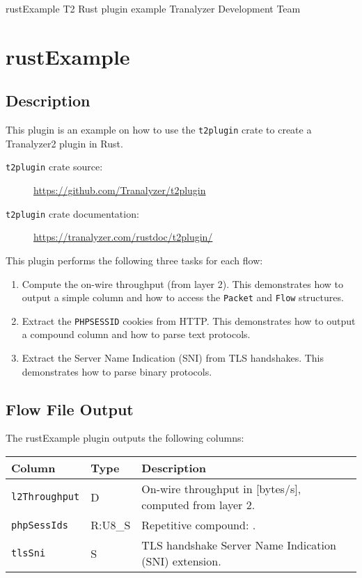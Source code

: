 \documentclass[documentation]{subfiles}
\begin{document}
\trantitle
    {rustExample} %
    {T2 Rust plugin example} %
    {Tranalyzer Development Team} %

\section{rustExample}\label{s:rustExample}

\subsection{Description}
This plugin is an example on how to use the {\tt t2plugin} crate to create a Tranalyzer2 plugin
in Rust.

\begin{description}
    \item[{\tt t2plugin} crate source:] {\url{https://github.com/Tranalyzer/t2plugin}}
    \item[{\tt t2plugin} crate documentation:] {\url{https://tranalyzer.com/rustdoc/t2plugin/}}
\end{description}

This plugin performs the following three tasks for each flow:

\begin{enumerate}
    \item Compute the on-wire throughput (from layer 2). This demonstrates how to output a simple
        column and how to access the {\tt Packet} and {\tt Flow} structures.
    \item Extract the {\tt PHPSESSID} cookies from HTTP. This demonstrates how to output a
        compound column and how to parse text protocols.
    \item Extract the Server Name Indication (SNI) from TLS handshakes. This demonstrates how to
        parse binary protocols.
\end{enumerate}

\subsection{Flow File Output}
The rustExample plugin outputs the following columns:
\begin{longtable}{llll}
    {\bf Column} & {\bf Type} & {\bf Description}\\
    \hline\endhead
    {\tt l2Throughput} & D & On-wire throughput in [bytes/s], computed from layer 2.\\
    {\tt phpSessIds} & R:U8\_S & Repetitive compound: \nameref{phpSessId}.\\
    {\tt tlsSni} & S & TLS handshake Server Name Indication (SNI) extension.\\
\end{longtable}
\end{document}
